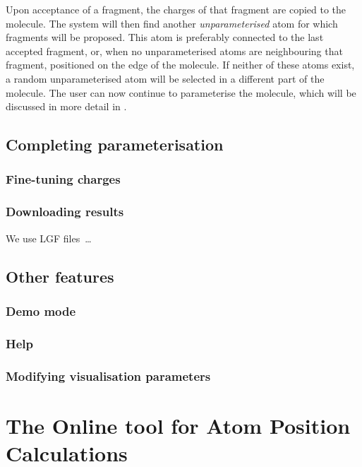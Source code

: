 Upon acceptance of a fragment, the charges of that fragment are copied to the molecule. The system will then find another \emph{unparameterised} atom for which fragments will be proposed. This atom is preferably connected to the last accepted fragment, or, when no unparameterised atoms are neighbouring that fragment, positioned on the edge of the molecule. If neither of these atoms exist, a random unparameterised atom will be selected in a different part of the molecule. The user can now continue to parameterise the molecule, which will be discussed in more detail in .


\subsection{Completing parameterisation}
\nlipsum


\subsubsection{Fine-tuning charges}
\nlipsum


\subsubsection{Downloading results}
We use LGF files~\cite{dezso2011lemon}\ldots

\nlipsum


\subsection{Other features}
\nlipsum

\subsubsection{Demo mode}
\nlipsum

\subsubsection{Help}
\nlipsum

\subsubsection{Modifying visualisation parameters}
\nlipsum


\section[\oapoc]{The Online tool for Atom Position Calculations}
\nlipsum

